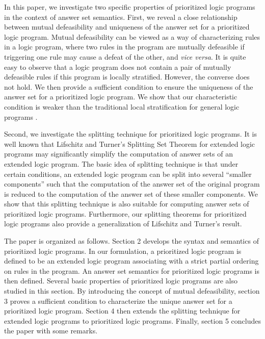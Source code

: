 \documentclass{tlp}
\begin{document}
In this paper, we
investigate two specific properties of
prioritized logic programs in the context of answer set semantics.
First, we reveal a close relationship between mutual defeasibility
and uniqueness of the answer set for a prioritized logic program.
Mutual defeasibility can be viewed as a way of characterizing rules in
a logic program, where two rules in the program are mutually defeasible if
triggering one rule may cause a defeat of the other, and {\em vice versa}.
It is quite easy to observe that a logic program does not contain a pair of
mutually defeasible rules if this program is locally stratified. However, the converse
does not hold. We then 
provide a sufficient condition to ensure the uniqueness of the answer set for
a prioritized logic program.
We show that our characteristic condition is weaker than
the traditional local stratification for general logic programs \cite{apt:94}.

Second, we investigate the splitting technique for 
prioritized logic programs. It is well known that
Lifschitz and Turner's Splitting Set Theorem \cite{lt:lp94}
for extended logic programs
may significantly simplify the computation of
answer sets of an extended logic program.
The basic idea of splitting technique 
is that under certain conditions, an extended logic
program can be split into several ``smaller components'' such that
the computation of the answer set of the original 
program is reduced to the computation of the answer set of these smaller 
components. We show that this splitting technique 
is also suitable for computing answer sets of prioritized logic programs.
Furthermore, our splitting theorems for prioritized logic programs
also provide a generalization of Lifschitz and Turner's result. 

The paper is organized as follows. Section 2 develops  
the syntax and semantics of prioritized logic programs. In our formulation,
a prioritized logic program is defined to be an extended logic program associating 
with a strict partial ordering on rules in the program. An answer set semantics 
for prioritized logic programs
is then defined. Several basic properties of prioritized logic programs are
also studied in this section. By introducing the concept of mutual 
defeasibility, section 3 proves a sufficient condition to characterize
the unique answer set for a prioritized logic program.
Section 4 then extends the splitting technique for extended logic programs to
prioritized logic programs.
Finally, section 5 concludes the paper with some remarks.
\end{document}
